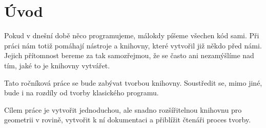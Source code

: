 \chapter{Úvod}
\label{chap:introduction}

Pokud v dnešní době něco programujeme, málokdy píšeme všechen kód sami. 
Při práci nám totiž pomáhají nástroje a knihovny, které vytvořil již někdo před námi.
Jejich přítomnost bereme za tak samozřejmou, že se často ani nezamýšlíme nad tím, jaké to je knihovny vytvářet.  

Tato ročníková práce se bude zabývat tvorbou knihovny. Soustředit se, mimo jiné, bude i na rozdíly od tvorby klasického programu.  

Cílem práce je vytvořit jednoduchou, ale snadno rozšířitelnou knihovnu pro geometrii v rovině, vytvořit k ní dokumentaci a přiblížit čtenáři proces tvorby. 